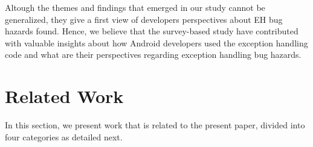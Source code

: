 Altough the themes and findings that emerged in our study cannot 
be generalized, they give a first view of developers perspectives about
 EH bug hazards found. Hence, we believe that the survey-based study 
have contributed with valuable insights about how Android developers 
used the exception handling code and what are their perspectives regarding
exception handling bug hazards.







\section{Related Work}
\label{sec:rele}

In this section, we present work that is related to the present paper, divided into
four categories as detailed next.

